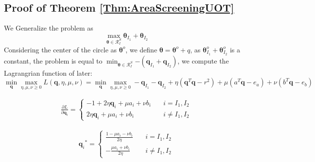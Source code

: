 \documentclass[twoside]{article}
\theoremstyle{plain}
\renewcommand{\vec}[1]{\bm{#1}}
\begin{document}
\subsection{Proof of Theorem \ref{Thm:AreaScreeningUOT}}
We Generalize the problem as 
\begin{equation}
\max_{\vec{\theta} \in \mathcal{R}^{S}_{I}}{ \vec{\theta}_{I_1} +\vec{\theta}_{I_2} }
\end{equation}
Considering the center of the circle as $\vec{\theta}^o$, we define $\vec{\theta} = \vec{\theta}^{o} + q$, as ${ \vec{\theta}^{o}_{I_1} +\vec{\theta}^{o}_{I_2} }$ is a constant, the problem is equal to $\min_{\vec{\theta} \in \mathcal{R}^{S}_{I}}{- ( \vec{q}_{I_1} +\vec{q}_{I_2} )}$, we compute the Lagrangrian function of later:
\begin{equation}
\min_{\vec{q}} \max_{\eta,\mu,\nu \geq 0} L(\vec{q},\eta,\mu,\nu) =\min_{\vec{q}}\max_{\eta,\mu,\nu\geq0} - {\vec{q}_{I_1} - \vec{q}_{I_2} + \eta( \vec{q}^T\vec{q} - r^2)+\mu( a^T\vec{q} - e_a ) + \nu( b^T\vec{q} - e_b )}
\end{equation}

 \begin{equation}
\begin{split} 
\frac{\partial L}{\partial \vec{q}_i} = \left\{
\begin{aligned}
-1 + 2\eta \vec{q}_i +\mu a_i + \nu b_i \quad& i = I_1, I_2\\
 2\eta \vec{q}_i +\mu a_i + \nu b_i \quad& i \neq I_1, I_2
\end{aligned}
\right.
 \end{split}
\label{eq:lang1}
\end{equation}

 \begin{equation}
\begin{split} 
{\vec{q}_i}^{*} = \left\{
\begin{aligned}
\frac{1- \mu a_i - \nu b_i}{2\eta} \quad& i = I_1, I_2\\
-\frac{\mu a_i + \nu b_i}{2\eta} \quad& i \neq I_1, I_2
\end{aligned}
\right.
 \end{split}
\label{eq:lang1}
\end{equation}
\end{document}
